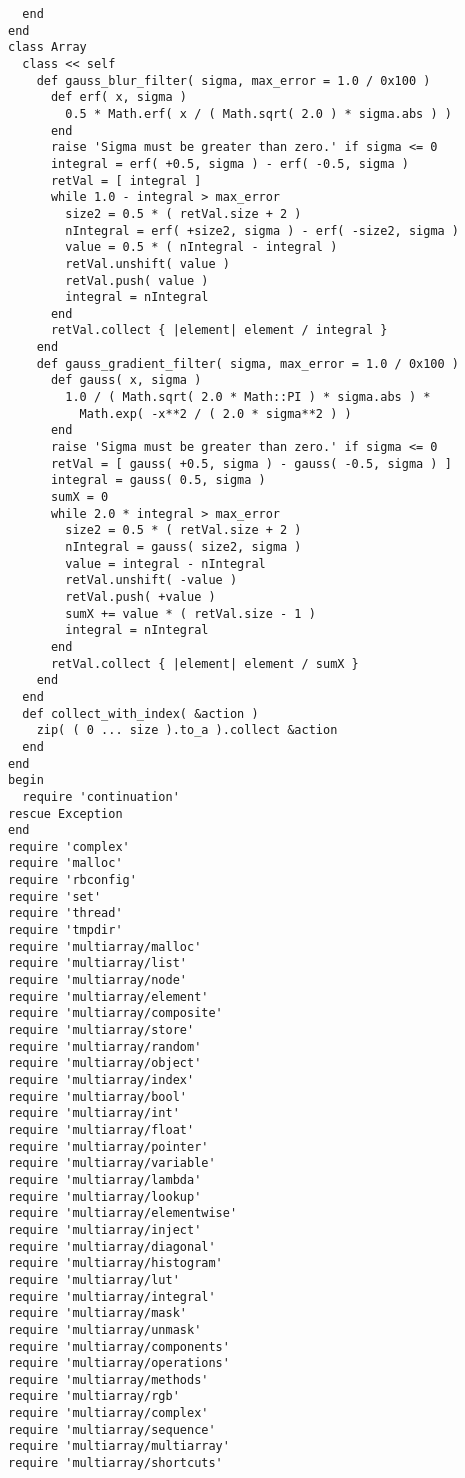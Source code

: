 \begin{lstlisting}
  end
end
class Array
  class << self
    def gauss_blur_filter( sigma, max_error = 1.0 / 0x100 )
      def erf( x, sigma )
        0.5 * Math.erf( x / ( Math.sqrt( 2.0 ) * sigma.abs ) )
      end
      raise 'Sigma must be greater than zero.' if sigma <= 0
      integral = erf( +0.5, sigma ) - erf( -0.5, sigma )
      retVal = [ integral ]
      while 1.0 - integral > max_error
        size2 = 0.5 * ( retVal.size + 2 )
        nIntegral = erf( +size2, sigma ) - erf( -size2, sigma )
        value = 0.5 * ( nIntegral - integral )
        retVal.unshift( value )
        retVal.push( value )
        integral = nIntegral
      end
      retVal.collect { |element| element / integral }
    end
    def gauss_gradient_filter( sigma, max_error = 1.0 / 0x100 )
      def gauss( x, sigma )
        1.0 / ( Math.sqrt( 2.0 * Math::PI ) * sigma.abs ) *
          Math.exp( -x**2 / ( 2.0 * sigma**2 ) )
      end
      raise 'Sigma must be greater than zero.' if sigma <= 0
      retVal = [ gauss( +0.5, sigma ) - gauss( -0.5, sigma ) ]
      integral = gauss( 0.5, sigma )
      sumX = 0
      while 2.0 * integral > max_error
        size2 = 0.5 * ( retVal.size + 2 )
        nIntegral = gauss( size2, sigma )
        value = integral - nIntegral
        retVal.unshift( -value )
        retVal.push( +value )
        sumX += value * ( retVal.size - 1 )
        integral = nIntegral
      end
      retVal.collect { |element| element / sumX }
    end
  end
  def collect_with_index( &action )
    zip( ( 0 ... size ).to_a ).collect &action
  end
end
begin
  require 'continuation'
rescue Exception
end
require 'complex'
require 'malloc'
require 'rbconfig'
require 'set'
require 'thread'
require 'tmpdir'
require 'multiarray/malloc'
require 'multiarray/list'
require 'multiarray/node'
require 'multiarray/element'
require 'multiarray/composite'
require 'multiarray/store'
require 'multiarray/random'
require 'multiarray/object'
require 'multiarray/index'
require 'multiarray/bool'
require 'multiarray/int'
require 'multiarray/float'
require 'multiarray/pointer'
require 'multiarray/variable'
require 'multiarray/lambda'
require 'multiarray/lookup'
require 'multiarray/elementwise'
require 'multiarray/inject'
require 'multiarray/diagonal'
require 'multiarray/histogram'
require 'multiarray/lut'
require 'multiarray/integral'
require 'multiarray/mask'
require 'multiarray/unmask'
require 'multiarray/components'
require 'multiarray/operations'
require 'multiarray/methods'
require 'multiarray/rgb'
require 'multiarray/complex'
require 'multiarray/sequence'
require 'multiarray/multiarray'
require 'multiarray/shortcuts'

\end{lstlisting}
